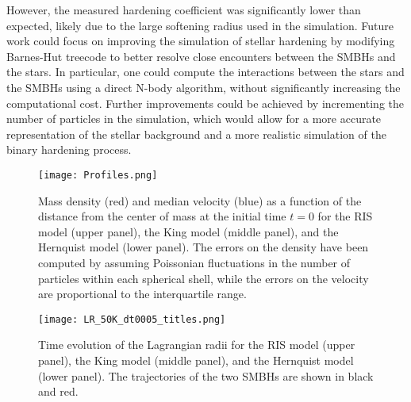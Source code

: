 \documentclass[fleqn,usenatbib]{mnras}
\begin{document}
However, the measured hardening coefficient was significantly lower than expected, likely due to the large softening radius used in the simulation.
Future work could focus on improving the simulation of stellar hardening by modifying Barnes-Hut treecode to better resolve close encounters between the SMBHs and the stars.
In particular, one could compute the interactions between the stars and the SMBHs using a direct N-body algorithm, without significantly increasing the computational cost.
Further improvements could be achieved by incrementing the number of particles in the simulation, which would allow for a more accurate representation of the stellar background and a more realistic simulation of the binary hardening process.


\nocite{*}

 


\phantom{}
\newpage
\phantom{}
\newpage
\phantom{}

\begin{figure}\centering
	\texttt{[image: Profiles.png]}
    \caption{Mass density (red) and median velocity (blue) as a function of the distance from the center of mass at the initial time $t=0$ for the RIS model (upper panel), the King model (middle panel), and the Hernquist model (lower panel). The errors on the density have been computed by assuming Poissonian fluctuations in the number of particles within each spherical shell, while the errors on the velocity are proportional to the interquartile range.}
    \label{fig:profiles}
\end{figure}

\begin{figure}\centering
	\texttt{[image: LR\_50K\_dt0005\_titles.png]}
    \caption{Time evolution of the Lagrangian radii for the RIS model (upper panel), the King model (middle panel), and the Hernquist model (lower panel). The trajectories of the two SMBHs are shown in black and red.}
    \label{fig:Lagrangian_radii}
\end{figure}
\end{document}
